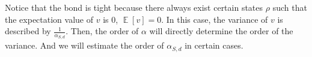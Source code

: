 \documentclass{article}
\newcommand{\mean}{\mathop{\mathbb{E}}}
\begin{document}
Notice that the bond is tight because there always exist certain states $\rho$ such that the expectation value of $v$ is $0$, $\mean[v] =0$. In this case, the variance of $v$ is described by $\frac{1}{\alpha_{S,d}}$. Then, the order of $\alpha$ will directly determine the order of the variance. 
And we will estimate the order of $\alpha_{S,d}$ in certain cases. 








\end{document}
